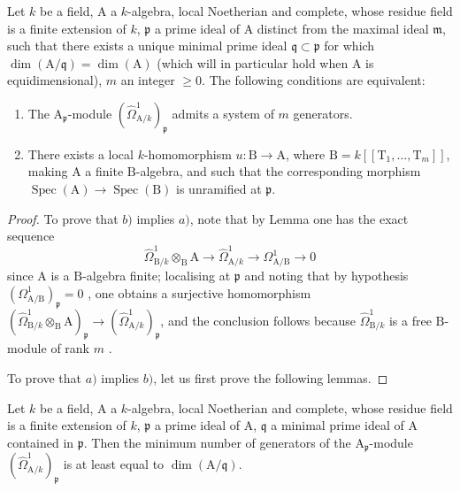 \begin{proposition}[18.11.5]
\label{IV.18.11.5}
Let $k$ be a field, $\mathrm{A}$ a $k$-algebra, local Noetherian and complete, whose residue field is a finite extension of $k$, $\mathfrak{p}$ a prime ideal of $\mathrm{A}$ distinct from the maximal ideal $\mathfrak{m}$, such that there exists a unique minimal prime ideal $\mathfrak{q}\subset\mathfrak{p}$ for which $\dim(\mathrm{A}/\mathfrak{q})=\dim(\mathrm{A})$ (which will in particular hold when $\mathrm{A}$ is equidimensional), $m$ an integer $\geq 0$.
The following conditions are equivalent:
\begin{enumerate}[label=\alph*)]
  \item The $\mathrm{A}_\mathfrak{p}$-module $(\hat{\Omega}^1_{\mathrm{A}/k})_\mathfrak{p}$ admits a system of $m$ generators.
  \item There exists a local $k$-homomorphism $u:\mathrm{B}\to\mathrm{A}$, where $\mathrm{B}=k[[\mathrm{T}_1,\ldots,\mathrm{T}_m]]$, making $\mathrm{A}$ a finite $\mathrm{B}$-algebra, and such that the corresponding morphism $\operatorname{Spec}(\mathrm{A})\to\operatorname{Spec}(\mathrm{B})$ is unramified at $\mathfrak{p}$.
\end{enumerate}
\end{proposition}

\begin{proof}
To prove that $b)$ implies $a)$, note that by Lemma  one has the exact sequence
\[
  \hat{\Omega}^1_{\mathrm{B}/k}\otimes_\mathrm{B}\mathrm{A}\to\hat{\Omega}^1_{\mathrm{A}/k}\to\Omega^1_{\mathrm{A}/\mathrm{B}}\to 0
\]
since $\mathrm{A}$ is a $\mathrm{B}$-algebra finite; localising at $\mathfrak{p}$ and noting that by hypothesis $(\Omega^1_{\mathrm{A}/\mathrm{B}})_\mathfrak{p}=0$ , one obtains a surjective homomorphism $(\hat{\Omega}^1_{\mathrm{B}/k}\otimes_\mathrm{B}\mathrm{A})_\mathfrak{p}\to(\hat{\Omega}^1_{\mathrm{A}/k})_\mathfrak{p}$, and
the conclusion follows because $\hat{\Omega}^1_{\mathrm{B}/k}$ is a free $\mathrm{B}$-module of rank $m$ .

To prove that $a)$ implies $b)$, let us first prove the following lemmas.
\end{proof}

\begin{lemma}[18.11.5.1]
\label{IV.18.11.5.1}
Let $k$ be a field, $\mathrm{A}$ a $k$-algebra, local Noetherian and complete, whose residue field is a finite extension of $k$, $\mathfrak{p}$ a prime ideal of $\mathrm{A}$, $\mathfrak{q}$ a minimal prime ideal of $\mathrm{A}$ contained in $\mathfrak{p}$.
Then the minimum number of generators of the $\mathrm{A}_\mathfrak{p}$-module $(\hat{\Omega}^1_{\mathrm{A}/k})_\mathfrak{p}$ is at least equal to $\dim(\mathrm{A}/\mathfrak{q})$.
\end{lemma}

